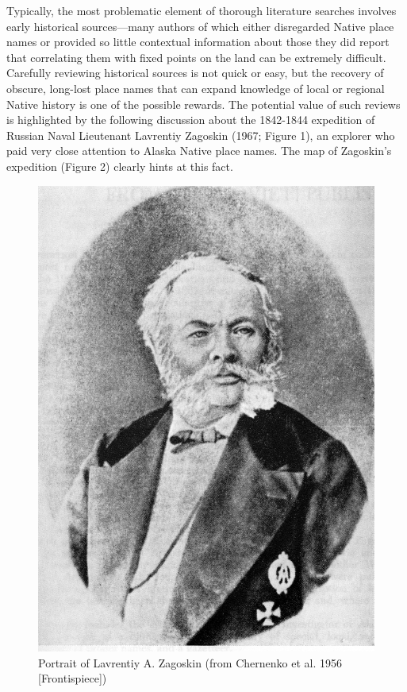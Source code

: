 Typically, the most problematic element of thorough literature searches involves early historical sources—many authors of which either disregarded Native place names or provided so little contextual information about those they did report that correlating them with fixed points on the land can be extremely difficult. Carefully reviewing historical sources is not quick or easy, but the recovery of obscure, long-lost place names that can expand knowledge of local or regional Native history is one of the possible rewards. The potential value of such reviews is highlighted by the following discussion about the 1842-1844 expedition of Russian Naval Lieutenant Lavrentiy Zagoskin (1967; Figure 1), an explorer who paid very close attention to Alaska Native place names. The map of Zagoskin’s expedition (Figure 2) clearly hints at this fact.

\begin{figure}[hbt]
    \centering
    \includegraphics{figures/pratt-fig1}
    \caption{Portrait of Lavrentiy A. Zagoskin (from Chernenko et al. 1956 [Frontispiece])}
    \label{fig1}
\end{figure}

